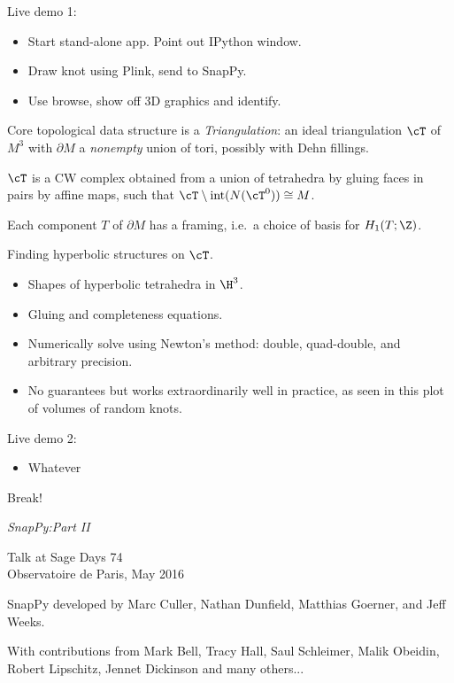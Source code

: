 \documentclass[aspect=16:10, tikz, half]{nmd/slide}
\begin{document}
\begin{frame}
  Live demo 1:
  \begin{itemize}
    \item Start stand-alone app. Point out IPython window.  
    \item Draw knot using Plink, send to SnapPy.
    \item Use browse, show off 3D graphics and identify.
  \end{itemize}
\end{frame}


\begin{frame}
  Core topological data structure is a \emph{Triangulation}: an ideal
  triangulation $\cT$ of $M^3$ with $\partial M$ a \emph{nonempty}
  union of tori, possibly with Dehn fillings.
  
  \bigskip

  $\cT$ is a CW complex obtained from a union of tetrahedra by gluing
  faces in pairs by affine maps, such that $\cT \setminus
  \mathrm{int}(N(\cT^{0})) \cong M$. 

  \bigskip

  Each component $T$ of $\partial M$ has a framing, i.e.~a choice of basis
  for $H_1(T; \Z)$. 
\end{frame}

\begin{frame}
Finding hyperbolic structures on $\cT$.
\begin{itemize}
\item Shapes of hyperbolic tetrahedra in $\H^3$.
\item Gluing and completeness equations.
\item Numerically solve using Newton's method: double, quad-double,
  and arbitrary precision. 
\item No guarantees but works extraordinarily well in practice, as
  seen in this plot of volumes of random knots.
\end{itemize}
\end{frame}

\begin{frame}
  Live demo 2:
  \begin{itemize}
    \item Whatever
  \end{itemize}
\end{frame}


\begin{frame}
  Break!
\end{frame}

\begin{frame}
  \emph{\Large SnapPy:Part II}

  Talk at Sage Days 74  \\
  Observatoire de Paris, May 2016

  \vspace{1.5cm}
  SnapPy developed by  Marc Culler, Nathan Dunfield, Matthias Goerner,
  and Jeff Weeks.  
  \vspace{0.5cm}

  With contributions from Mark Bell, Tracy Hall, Saul Schleimer, Malik
  Obeidin, Robert Lipschitz, Jennet Dickinson and many others...
 
\end{frame}
\end{document}
